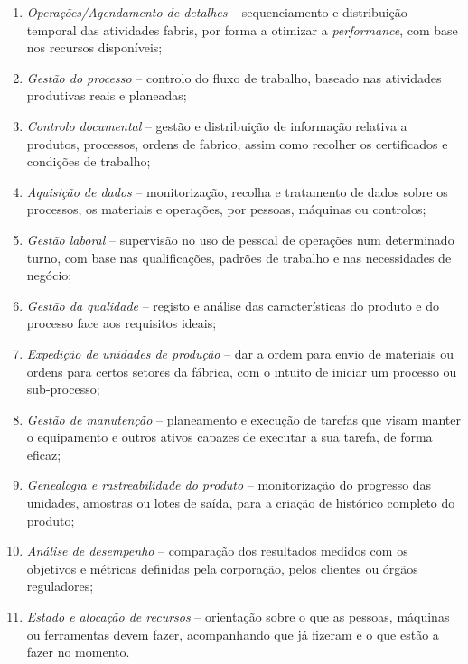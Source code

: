 \begin{enumerate}
    \item 
    {
        \textit{Operações/Agendamento de detalhes} -- sequenciamento e distribuição temporal das atividades fabris, por forma a otimizar a \textit{performance}, com base nos recursos disponíveis;
    }
    \item
    {
        \textit{Gestão do processo} -- controlo do fluxo de trabalho, baseado nas atividades produtivas reais e planeadas;
    }
    \item
    {
        \textit{Controlo documental} -- gestão e distribuição de informação relativa a produtos, processos, ordens de fabrico, assim como recolher os certificados e condições de trabalho;
    }
    \item
    {
        \textit{Aquisição de dados} -- monitorização, recolha e tratamento de dados sobre os processos, os materiais e operações, por pessoas, máquinas ou controlos;
    }
    \item
    {
        \textit{Gestão laboral} -- supervisão no uso de pessoal de operações num determinado turno, com base nas qualificações, padrões de trabalho e nas necessidades de negócio;
    }
    \item
    {
        \textit{Gestão da qualidade} -- registo e análise das características do produto e do processo face aos requisitos ideais;
    }
    \item
    {
        \textit{Expedição de unidades de produção} -- dar a ordem para envio de materiais ou ordens para certos setores da fábrica, com o intuito de iniciar um processo ou sub-processo;
    }
    \item
    {
        \textit{Gestão de manutenção} -- planeamento e execução de tarefas que visam manter o equipamento e outros ativos capazes de executar a sua tarefa, de forma eficaz;
    }
    \item
    {
        \textit{Genealogia e rastreabilidade do produto} -- monitorização do progresso das unidades, amostras ou lotes de saída, para a criação de histórico completo do produto;
    }
    \item
    {
        \textit{Análise de desempenho} -- comparação dos resultados medidos com os objetivos e métricas definidas pela corporação, pelos clientes ou órgãos reguladores;
    }
    \item
    {
        \textit{Estado e alocação de recursos} -- orientação sobre o que as pessoas, máquinas ou ferramentas devem fazer, acompanhando que já fizeram e o que estão a fazer no momento.
    }
\end{enumerate}

